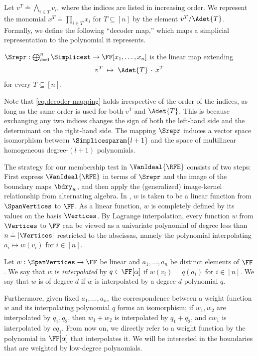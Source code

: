 Let $v^T\doteq \bigwedge_{i\in T} v_i$, where the indices are listed in increasing order. We represent the monomial $x^T \doteq \prod_{i \in T} x_i$ for $T \subseteq [n]$ by the element $v^T/\Adet{T}$. Formally, we define the following ``decoder map,'' which maps a simplicial representation to the polynomial it represents.
\begin{definition}[representation]
  \label{def.Srepr-prim}
  \(\Srepr : \bigoplus_{t=0}^{n}\Simplicest \to \FF[x_1,\ldots,x_n]\) is the linear
  map extending
  \begin{equation}\label{eq.decoder-mapping}
    v^T
    \;\mapsto\;
    \Adet{T}\,\cdot\,x^T
  \end{equation}
  for every $T \subseteq [n]$.
\end{definition}
Note that \eqref{eq.decoder-mapping} holds irrespective of the order of the indices, as long as the same order is used for both $v^T$ and $\Adet{T}$. This is because exchanging any two indices changes the sign of both the left-hand side and the determinant on the right-hand side. The mapping \(\Srepr\) induces a vector space isomorphism between
\(\Simplicesparam{l+1}\) and the space of multilinear homogeneous degree-\((l+1)\) polynomials.

\medskip

The strategy for our membership test in \(\VanIdeal{\RFE}\) consists of two steps: First express \(\VanIdeal{\RFE}\) in terms of $\Srepr$ and the image of the boundary maps $\bdry_w$, and then apply the (generalized) image-kernel relationship from alternating algebra. In , $w$ is taken to be a linear function from $\SpanVertices$ to $\FF$. As a linear function, $w$ is completely defined by its values on the basis $\Vertices$. By Lagrange interpolation, every function $w$ from $\Vertices$ to $\FF$ can be viewed as a univariate polynomial of degree less than $n \doteq |\Vertices|$ restricted to the abscissas, namely the polynomial interpolating $a_i \mapsto w(v_i)$ for $i \in [n]$. 
\begin{definition}
  \label{def.deg.polybdry}
  Let $w: \SpanVertices \to \FF$ be linear and $a_1, \dots, a_n$ be distinct elements of $\FF$. We say that $w$ is \emph{interpolated} by $q\in \FF[\alpha]$ if $w(v_i) = q(a_i)$ for $i\in [n]$. We say that $w$  is of degree $d$ if $w$ is interpolated by a degree-$d$ polynomial $q$.
\end{definition}

Furthermore, given fixed $a_1,\dots,a_n$, the correspondence between a weight function $w$ and its interpolating polynomial $q$ forms an isomorphism; if $w_1,w_2$ are interpolated by $q_1,q_2$, then $w_1+w_2$ is interpolated by $q_1+q_2$, and $cw_1$ is interpolated by $cq_1$. From now on, we directly refer to a weight function by the polynomial in $\FF[\alpha]$ that interpolates it. We will be interested in the boundaries that are weighted by low-degree polynomials.

